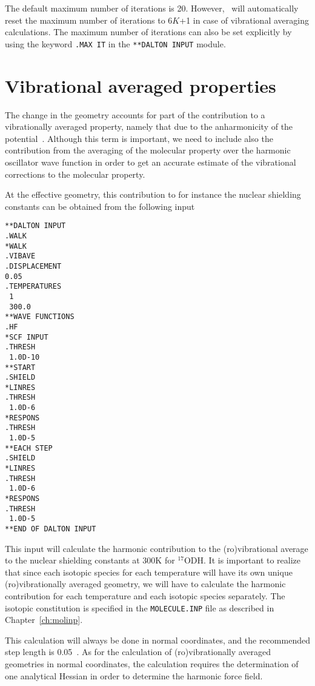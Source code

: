 The default maximum number of iterations is 20. However, \dalton\ will
automatically reset the maximum number of iterations to 6$K$+1 in case
of vibrational averaging calculations. The maximum number of
iterations can also be set explicitly by using
the keyword \verb|.MAX IT| in the \verb|**DALTON INPUT| module.

\section{Vibrational averaged
properties}\label{sec:vibavegeo}

The change in the geometry accounts for part of the contribution to a
vibrationally averaged property, namely that due to the anharmonicity
of the potential~\cite{krpoaprtjacs123}. Although this term is important, we need to
include also the contribution from the averaging of the molecular
property over the harmonic oscillator wave function in order to get an
accurate estimate of the vibrational corrections to the molecular
property. 

At the effective geometry, this contribution to for instance the
nuclear shielding constants can be obtained from the following input
\begin{verbatim}
**DALTON INPUT
.WALK
*WALK
.VIBAVE
.DISPLACEMENT
0.05
.TEMPERATURES
 1
 300.0
**WAVE FUNCTIONS
.HF
*SCF INPUT
.THRESH
 1.0D-10
**START
.SHIELD
*LINRES
.THRESH
 1.0D-6
*RESPONS
.THRESH
 1.0D-5
**EACH STEP
.SHIELD
*LINRES
.THRESH
 1.0D-6
*RESPONS
.THRESH
 1.0D-5
**END OF DALTON INPUT
\end{verbatim}

This input will calculate the harmonic contribution to the
(ro)vibrational average to the nuclear shielding constants at 300K for
$^{17}$ODH. It is important to realize that since each isotopic
species for each temperature will have its own unique
(ro)vibrationally averaged geometry, we will have to calculate the
harmonic contribution for each temperature and each isotopic species
separately. The isotopic constitution is specified in the
\verb|MOLECULE.INP| file as described in Chapter~\ref{ch:molinp}.

This calculation will always be done in normal coordinates, and the
recommended step length is 0.05~\cite{krpoaprtjcp112}. As for the calculation of
(ro)vibrationally averaged geometries in normal coordinates, the
calculation requires the determination of one analytical Hessian in
order to determine the harmonic force field.


